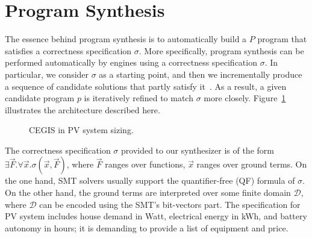 \documentclass[a4paper,donotrepeattitle,fleqn]{cas-dc}
\begin{document}
\section{Program Synthesis}
\label{sec:Synthesis}

The essence behind program synthesis is to automatically build a $P$ program that satisfies a correctness specification $\sigma$. More specifically, program synthesis can be performed automatically by engines using a correctness specification $\sigma$. In particular, we consider $\sigma$ as a starting point, and then we incrementally produce a sequence of candidate solutions that partly satisfy it~\cite{Abateetal2017}. As a result, a given candidate program $p$ is iteratively refined to match $\sigma$ more closely. Figure~\ref{Counter-Example-Guided-Inductive-Synthesis} illustrates the architecture described here.
%
\begin{figure}[ht]
\begin{center}
\end{center}
	\caption{CEGIS in PV system sizing.}
	\label{Counter-Example-Guided-Inductive-Synthesis}
\end{figure}

The correctness specification $\sigma$ provided to our synthesizer is of the form $\exists \vec{F}. \forall \vec{x}. \sigma(\vec{x}, \vec{F})$, where $\vec{F}$ ranges over functions, $\vec{x}$ ranges over ground terms. On the one hand, SMT solvers usually support the quantifier-free (QF) formula of $\sigma$. On the other hand, the ground terms are interpreted over some finite domain $\mathcal{D}$, where $\mathcal{D}$ can be encoded using the SMT's bit-vectors part. The specification for PV system includes house demand in Watt, electrical energy in kWh, and battery autonomy in hours; it is demanding to provide a list of equipment and price.
\end{document}
